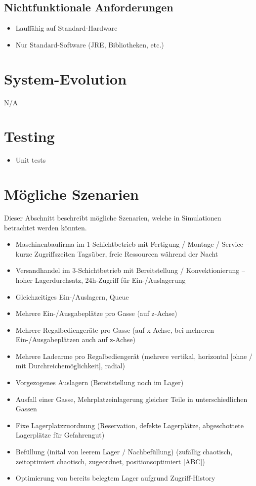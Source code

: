 \documentclass[11pt,a4paper]{article}
\begin{document}
\subsection{Nichtfunktionale Anforderungen}
\begin{itemize}
  \item Lauffähig auf Standard-Hardware
  \item Nur Standard-Software (JRE, Bibliotheken, etc.)
\end{itemize}
%
\section{System-Evolution}
N/A
%
\section{Testing}
\begin{itemize}
  \item Unit tests
\end{itemize}
%
\section{Mögliche Szenarien}\label{szenarien}
Dieser Abschnitt beschreibt mögliche Szenarien, welche in Simulationen betrachtet werden könnten.
%
\begin{itemize}
  \item Maschinenbaufirma im 1-Schichtbetrieb mit Fertigung / Montage / Service -- kurze Zugriffszeiten Tagsüber, freie Ressourcen während der Nacht
  \item Versandhandel im 3-Schichtbetrieb mit Bereitstellung / Konvektionierung --  hoher Lagerdurchsatz, 24h-Zugriff für Ein-/Auslagerung
  \item Gleichzeitiges Ein-/Auslagern, Queue
  \item Mehrere Ein-/Ausgabeplätze pro Gasse (auf z-Achse)
  \item Mehrere Regalbediengeräte pro Gasse (auf x-Achse, bei mehreren Ein-/Ausgabeplätzen auch auf z-Achse)
  \item Mehrere Ladearme pro Regalbediengerät (mehrere vertikal, horizontal [ohne / mit Durchreichemöglichkeit], radial)
  \item Vorgezogenes Auslagern (Bereitstellung noch im Lager)
  \item Ausfall einer Gasse, Mehrplatzeinlagerung gleicher Teile in unterschiedlichen Gassen
  \item Fixe Lagerplatzzuordnung (Reservation, defekte Lagerplätze, abgeschottete Lagerplätze für Gefahrengut)
  \item Befüllung (inital von leerem Lager / Nachbefüllung) (zufällig chaotisch, zeitoptimiert chaotisch, zugeordnet, positionsoptimiert [ABC])
  \item Optimierung von bereits belegtem Lager aufgrund Zugriff-History
\end{itemize}
%
\end{document}
